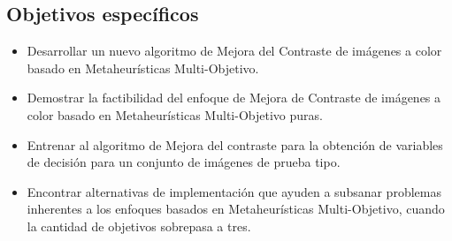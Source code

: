 \subsection{Objetivos específicos}
\begin{itemize}

	\item Desarrollar un nuevo algoritmo de Mejora del Contraste de imágenes a color basado en Metaheurísticas Multi-Objetivo.

	\item Demostrar la factibilidad del enfoque de Mejora de Contraste de imágenes a color basado en Metaheurísticas Multi-Objetivo puras.

    \item Entrenar al algoritmo de Mejora del contraste para la obtención de variables de decisión para un conjunto de imágenes de prueba tipo.

	\item Encontrar alternativas de implementación que ayuden a subsanar problemas inherentes a los enfoques basados en Metaheurísticas Multi-Objetivo, cuando la cantidad de objetivos sobrepasa a tres.







\end{itemize}

